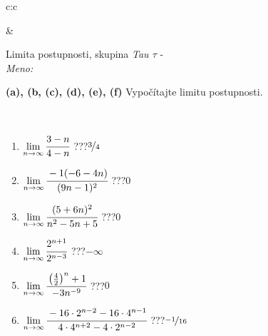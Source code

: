 \documentclass[10pt]{report}
\begin{document}
\begin{tabular}{c:c}
\begin{minipage}[c][104.5mm][t]{0.5\linewidth}
\begin{center}
\begin{minipage}{0.20\linewidth}
\begin{center}
\end{center}
\end{minipage}
\end{center}
\end{minipage}
&
\begin{minipage}[c][104.5mm][t]{0.5\linewidth}
\begin{center}
\vspace{5mm}
{\huge Limita postupnosti, skupina \textit{Tau $\tau$} -}\\[5mm]
\textit{Meno:}\phantom{xxxxxxxxxxxxxxxxxxxxxxxxxxxxxxxxxxxxxxxxxxxxxxxxxxxxxxxxxxxxxxxxx}\\[5mm]
\begin{minipage}{0.95\linewidth}
\begin{center}
{
\textbf{(a), (b, (c), (d), (e), (f)} Vypočítajte limitu postupnosti. \\[-1mm]
\phantom{x}
}
\end{center}
\end{minipage}
\\[1mm]
\begin{minipage}{0.79\linewidth}
\begin{center}
\begin{varwidth}{\linewidth}
\setlength{\itemsep}{0pt}
\begin{enumerate}
\normalsize
\item $\lim\limits_{n\to\infty}\cfrac{3-n}{4-n}$\quad \dotfill\; ???\;\dotfill \quad $\nicefrac{3}{4}$
\item $\lim\limits_{n\to\infty}\cfrac{-1(-6-4n)}{(9n-1)^2}$\quad \dotfill\; ???\;\dotfill \quad $0$
\item $\lim\limits_{n\to\infty}\cfrac{(5+6n)^2}{n^2-5n+5}$\quad \dotfill\; ???\;\dotfill \quad $0$
\item $\lim\limits_{n\to\infty}\cfrac{2^{n+1}}{2^{n-3}}$\quad \dotfill\; ???\;\dotfill \quad $-\infty$
\item $\lim\limits_{n\to\infty}\cfrac{\left(\frac{4}{2}\right)^n +1}{-3n^{-9}}$\quad \dotfill\; ???\;\dotfill \quad $0$
\item $\lim\limits_{n\to\infty}\cfrac{-16\cdot 2^{n-2}-16\cdot 4^{n-1}}{4\cdot 4^{n+2}-4\cdot 2^{n-2}}$\quad \dotfill\; ???\;\dotfill \quad $\nicefrac{-1}{16}$
\end{enumerate}
\end{varwidth}
\end{center}
\end{minipage}
\begin{minipage}{0.20\linewidth}
\begin{center}

\end{center}
\end{minipage}
\end{center}
\end{minipage}
\end{tabular}
\end{document}
